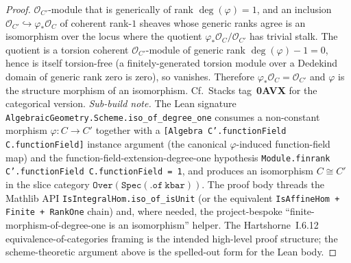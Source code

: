 \begin{proof}
  \(\mathcal O_{C'}\)-module that is generically of rank $\deg(\varphi) =
  1$, and an inclusion $\mathcal O_{C'} \hookrightarrow \varphi_*
  \mathcal O_C$ of coherent rank-$1$ sheaves whose generic ranks agree
  is an isomorphism over the locus where the quotient
  \(\varphi_* \mathcal O_C / \mathcal O_{C'}\) has trivial stalk. The
  quotient is a torsion coherent \(\mathcal O_{C'}\)-module of generic rank
  \(\deg(\varphi) - 1 = 0\), hence is itself torsion-free (a
  finitely-generated torsion module over a Dedekind domain of generic
  rank zero is zero), so vanishes. Therefore $\varphi_* \mathcal O_C =
  \mathcal O_{C'}$ and $\varphi$ is the structure morphism of an
  isomorphism. Cf.\ Stacks tag~\textbf{0AVX} for the categorical version.
  \emph{Sub-build note.} The Lean signature
  \texttt{AlgebraicGeometry.Scheme.iso\_of\_degree\_one} consumes a
  non-constant morphism \(\varphi \colon C \to C'\) together with a
  \texttt{[Algebra C'.functionField C.functionField]} instance argument
  (the canonical \(\varphi\)-induced function-field map) and the
  function-field-extension-degree-one hypothesis
  \texttt{Module.finrank C'.functionField C.functionField = 1}, and
  produces an isomorphism \(C \cong C'\) in the slice category
  \(\mathtt{Over (Spec (.of\ kbar))}\). The proof body threads the Mathlib
  API \texttt{IsIntegralHom.iso\_of\_isUnit} (or the equivalent
  \texttt{IsAffineHom + Finite + RankOne} chain) and, where needed, the
  project-bespoke ``finite-morphism-of-degree-one is an isomorphism''
  helper. The Hartshorne~I.6.12 equivalence-of-categories framing is the
  intended high-level proof structure; the scheme-theoretic argument
  above is the spelled-out form for the Lean body.
\end{proof}
